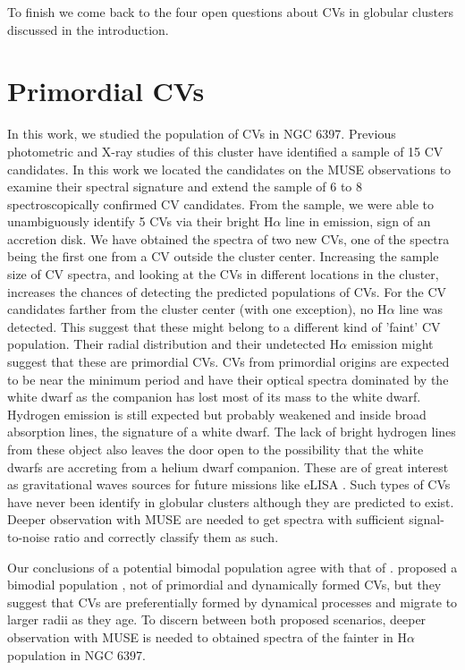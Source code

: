 To finish we come back to the four open questions about CVs in globular clusters discussed in the introduction. 

\section{Primordial CVs}

In this work, we studied the population of CVs in NGC 6397. Previous photometric and X-ray studies of this cluster have identified a sample of 15 CV candidates. In this work we located the candidates on the MUSE observations to examine their spectral signature and extend the sample of 6 to 8 spectroscopically confirmed CV candidates. From the sample, we were able to unambiguously identify 5 CVs via their bright H$\alpha$ line in emission, sign of an accretion disk. We have obtained the spectra of two new CVs, one of the spectra being the first one from a CV outside the cluster center. Increasing the sample size of CV spectra, and looking at the CVs in different locations in the cluster, increases the chances of detecting the predicted populations of CVs. For the CV candidates farther from the cluster center (with one exception), no H$\alpha$ line was detected. This suggest that these might belong to a different kind of 'faint' CV population. Their radial distribution and their undetected H$\alpha$ emission might suggest that these are primordial CVs. CVs from primordial origins are expected to be near the minimum period and have their optical spectra dominated by the white dwarf as the companion has lost most of its mass to the white dwarf. Hydrogen emission is still expected but probably weakened and inside broad absorption lines, the signature of a white dwarf. The lack of bright hydrogen lines from these object also leaves the door open to the possibility that the white dwarfs are accreting from a helium dwarf companion. These are of great interest as gravitational waves sources for future missions like eLISA \citep{elisa2012}. Such types of CVs have never been identify in globular clusters although they are predicted to exist. Deeper observation with MUSE are needed to get spectra with sufficient signal-to-noise ratio and correctly classify them as such. 

Our conclusions of a potential bimodal population agree with that of \cite{cohn_identification_2010}. \citeauthor{cohn_identification_2010} proposed a bimodial population , not of primordial and dynamically formed CVs, but they suggest that CVs are preferentially formed by dynamical processes and migrate to larger radii as they age. To discern between both proposed scenarios, deeper observation with MUSE is needed to obtained spectra of the fainter in H$\alpha$ population in NGC 6397. 

